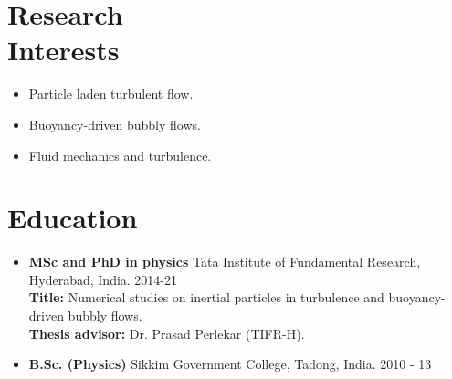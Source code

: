 \documentclass[margin]{res}
\begin{document}
 
 
 
\address{{Research Scholar} \\ Tata Institute of Fundamental Research \\ Gopanpally \\ Hyderabad, India 500107  \\
        Ph: +91-9581147082\\
        \href{vikashp@tifrh.res.in}{vikashp@tifrh.res.in},
        \href{vikashpandey.phy@gmail.com}{vikashpandey.phy@gmail.com}}

\address{}

 
\begin{resume} 
    \section{Research  \\Interests}
    \begin{itemize}
            \item Particle laden turbulent flow.
            \item Buoyancy-driven bubbly flows. 
            \item Fluid mechanics and turbulence. 
    \end{itemize}

\section{Education} 
    \begin{itemize}
        \item {\bf MSc and PhD in physics} Tata Institute of Fundamental Research,\\ Hyderabad, India. \hfill 2014-21 \\
{\bf Title:} Numerical studies on inertial particles in turbulence and buoyancy-driven bubbly flows.\\
    {\bf Thesis advisor:} Dr. Prasad Perlekar (TIFR-H).\\
    \item {\bf B.Sc. (Physics)} Sikkim Government College, Tadong, India. \hfill 2010 - 13
    \end{itemize} 

\end{resume}
\end{document}
